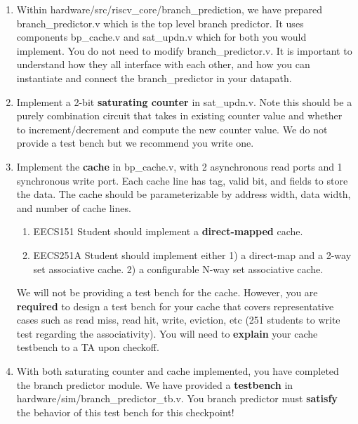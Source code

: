\begin{enumerate}
  \item Within hardware/src/riscv\_core/branch\_prediction, we have prepared branch\_predictor.v which is the top level branch predictor. It uses components bp\_cache.v and sat\_updn.v which for both you would implement. You do not need to modify branch\_predictor.v. It is important to understand how they all interface with each other, and how you can instantiate and connect the branch\_predictor in your datapath.
  \item Implement a 2-bit \textbf{saturating counter} in sat\_updn.v. Note this should be a purely combination circuit that takes in existing counter value and whether to increment/decrement and compute the new counter value. We do not provide a test bench but we recommend you write one.
  \item Implement the \textbf{cache} in bp\_cache.v, with 2 asynchronous read ports and 1 synchronous write port. Each cache line has tag, valid bit, and fields to store the data. The cache should be parameterizable by address width, data width, and number of cache lines.
  \begin{enumerate}
      \item EECS151 Student should implement a \textbf{direct-mapped} cache.
      \item EECS251A Student should implement either 1) a direct-map and a 2-way set associative cache. 2) a configurable N-way set associative cache. 
    \end{enumerate}
   We will not be providing a test bench for the cache. However, you are \textbf{required} to design a test bench for your cache that covers representative cases such as read miss, read hit, write, eviction, etc (251 students to write test regarding the associativity). You will need to \textbf{explain} your cache testbench to a TA upon checkoff. 
  \item With both saturating counter and cache implemented, you have completed the branch predictor module. We have provided a \textbf{testbench} in hardware/sim/branch\_predictor\_tb.v. You branch predictor must \textbf{satisfy} the behavior of this test bench for this checkpoint!
  

\end{enumerate}
